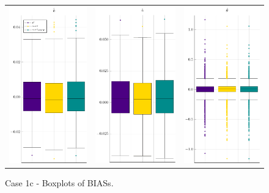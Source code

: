 \begin{figure}[H] 
	
	\centering
	\begin{tabular}[b]{c c c}
		\includegraphics[width=.3\textwidth]{Figures/1c/BIAS_b.pdf} & \includegraphics[width=.3\textwidth]{Figures/1c/BIAS_a.pdf} & \includegraphics[width=.3\textwidth]{Figures/1c/BIAS_t.pdf}
	\end{tabular}
	\caption{Case 1c - Boxplots of BIASs.}
	\label{fig:bpBIAS1c}
\end{figure}
